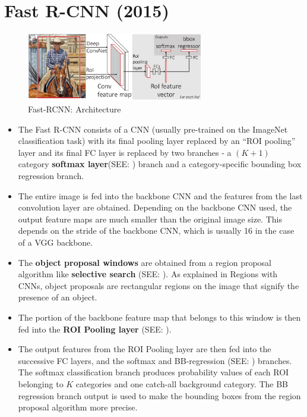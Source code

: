 \section{Fast R-CNN (2015) \cite{arxiv/1504.08083-fast-rcnn,medium/towardsdatascience.com/fast-r-cnn-for-object-detection-a-technical-summary-a0ff94faa022}}\label{Fast R-CNN}

\begin{figure}[h]
    \centering
    \includegraphics[width=\linewidth, height=3cm, keepaspectratio]{Pictures/convolutional-neural-network/fast-rcnn-arch.png}
    \caption{Fast-RCNN: Architecture \cite{arxiv/1504.08083-fast-rcnn}}
\end{figure}

\begin{itemize}
    \item The Fast R-CNN consists of a CNN (usually pre-trained on the ImageNet classification task) with its final pooling layer replaced by an “ROI pooling” layer and its final FC layer is replaced by two branches - a $(K + 1)$ category \textbf{softmax layer}(SEE: ) branch and a category-specific bounding box regression branch.

    \item The entire image is fed into the backbone CNN and the features from the last convolution layer are obtained. Depending on the backbone CNN used, the output feature maps are much smaller than the original image size. This depends on the stride of the backbone CNN, which is usually 16 in the case of a VGG backbone.

    \item The \textbf{object proposal windows} are obtained from a region proposal algorithm like \textbf{selective search} (SEE: ). As explained in Regions with CNNs, object proposals are rectangular regions on the image that signify the presence of an object.

    \item The portion of the backbone feature map that belongs to this window is then fed into the \textbf{ROI Pooling layer} (SEE: ).

    \item The output features from the ROI Pooling layer are then fed into the successive FC layers, and the softmax and BB-regression (SEE: ) branches. The softmax classification branch produces probability values of each ROI belonging to $K$ categories and one catch-all background category. The BB regression branch output is used to make the bounding boxes from the region proposal algorithm more precise.
\end{itemize}


